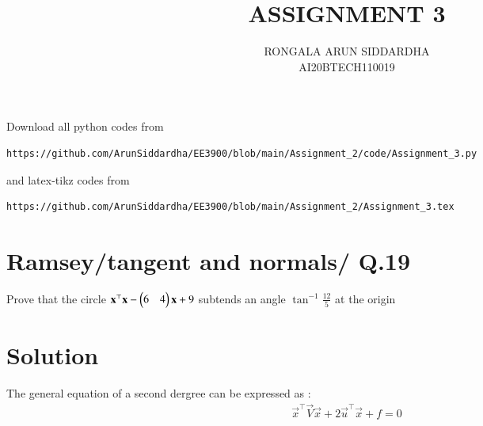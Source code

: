 \documentclass[journal,12pt,twocolumn]{IEEEtran}
\begin{document}
     \def\centbox#1{\makebox[0in]{#1}}
     \def\topbox#1{\raisebox{-\baselineskip}[0in][0in]{#1}}
     \def\midbox#1{\raisebox{-0.5\baselineskip}[0in][0in]{#1}}
\vspace{3cm}
\title{ASSIGNMENT 3}
\author{RONGALA ARUN SIDDARDHA \\ AI20BTECH110019}
\maketitle
\newpage
\bigskip
\renewcommand{\thefigure}{\theenumi}
\renewcommand{\thetable}{\theenumi}
Download all python codes from 
\begin{lstlisting}
https://github.com/ArunSiddardha/EE3900/blob/main/Assignment_2/code/Assignment_3.py
\end{lstlisting}
%
and latex-tikz codes from 
%
\begin{lstlisting}
https://github.com/ArunSiddardha/EE3900/blob/main/Assignment_2/Assignment_3.tex
\end{lstlisting}
%
\section{Ramsey/tangent and normals/ Q.19}
Prove that the circle $\mathbf{x}^\top\mathbf{x}-\begin{pmatrix}6 & 4\end{pmatrix}\mathbf{x} + 9$ subtends an angle $\tan^{-1}{\frac{12}{5}}$ at the origin
%
\section{Solution}
The general equation of a second dergree can be expressed as :
\begin{align}
    \vec{x}^\top\vec{V}\vec{x}+2\vec{u}^\top\vec{x} + f = 0 
\end{align}
\end{document}
